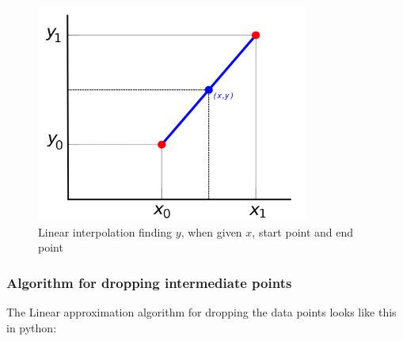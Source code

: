 \documentclass[12pt]{article}
\begin{document}
\begin{figure}[H]
  \centering
  \includegraphics[width=0.8\textwidth]{linear_interpolation}
  \caption{Linear interpolation finding $y$, when given $x$, start point and end point ~\cite{linear_interpolation}}
  \label{fig:linear_interpolation}
\end{figure}

\subsubsection{Algorithm for dropping intermediate points}

The Linear approximation algorithm for dropping the data points looks like this in python:
\end{document}
